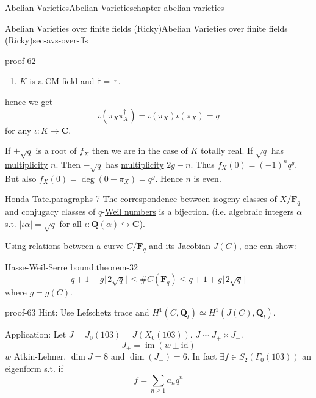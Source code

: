 \documentclass[oneside,10pt,]{book}
\numberwithin{equation}{section}
\newcommand{\QQ}{\mathbf{Q}}
\newcommand{\CC}{\mathbf{C}}
\newcommand{\FF}{\mathbf{F}}
\newcommand{\id}{\mathrm{id}}
\DeclareMathOperator{\im}{im}
\begin{document}
\begin{chapterptx}{Abelian Varieties}{}{Abelian Varieties}{}{}{chapter-abelian-varieties}
\begin{sectionptx}{Abelian Varieties over finite fields (Ricky)}{}{Abelian Varieties over finite fields (Ricky)}{}{}{sec-avs-over-ffs}
\begin{proofptx}{}{proof-62}
\begin{enumerate}
\item\hypertarget{li-65}{}\(K\) is a CM field and \(\dagger = \overline{\cdot}\).%
\end{enumerate}
hence we get%
\begin{equation*}
\iota(\pi_X\pi_X^\dagger) = \iota(\pi_X) \overline{\iota(\pi_X)} = q
\end{equation*}
for any \(\iota\colon K \to \CC\).%
\par
\hypertarget{p-370}{}%
If \(\pm \sqrt q\) is  a root  of  \(f_X\) then we are in the case of \(K\) totally real. If \(\sqrt q\) has \hyperref[def-riem-order-vanish]{multiplicity} \(n\). Then \(-\sqrt q\) has \hyperref[def-riem-order-vanish]{multiplicity} \(2g-n\). Thus \(f_X(0) = (-1)^n   q^g\). But also \(f_X(0 ) = \deg(0 - \pi_X) = q^g\). Hence \(n \) is even.%
\end{proofptx}
\begin{paragraphs}{Honda-Tate.}{paragraphs-7}%
\hypertarget{p-371}{}%
The correspondence between \hyperref[def-supersing-isog-isog]{isogeny} classes of \(X/\FF_q\) and conjugacy classes of \(q\)-\hyperref[sec-honda-tate]{Weil numbers} is a bijection. (i.e. algebraic integers \(\alpha\) s.t. \(|\iota \alpha| = \sqrt q\) for all \(\iota \colon \QQ(\alpha) \hookrightarrow \CC\)).%
\end{paragraphs}%
\par
\hypertarget{p-372}{}%
Using relations between a curve \(C/\FF_q\) and its Jacobian \(J(C) \), one can show:%
\begin{theorem}{Hasse-Weil-Serre bound.}{}{theorem-32}%
\hypertarget{p-373}{}%
%
\begin{equation*}
q + 1 - g\lfloor 2\sqrt q\rfloor \le \#C(\FF_{q}) \le q + 1 + g\lfloor 2\sqrt q\rfloor
\end{equation*}
where \(g=  g(C)\).%
\end{theorem}
\begin{proofptx}{}{proof-63}
\hypertarget{p-374}{}%
Hint: Use Lefschetz trace and \(H^1(C, \QQ_l) \simeq H^1(J(C) , \QQ_l)\).%
\end{proofptx}
\hypertarget{p-375}{}%
Application: Let \(J = J_0(103) = J(X_0(103))\). \(J\sim J_+ \times J_-\).%
\begin{equation*}
J_{\pm} = \im(w \pm \id)
\end{equation*}
\(w\) Atkin-Lehner. \(\dim J = 8\) and \(\dim(J_-) = 6\). In fact \(\exists f\in  S_2( \Gamma_0(103))\) an eigenform s.t. if%
\begin{equation*}
f=\sum_{n\ge 1} a_n q^n
\end{equation*}

\end{sectionptx}
\end{chapterptx}
\end{document}
